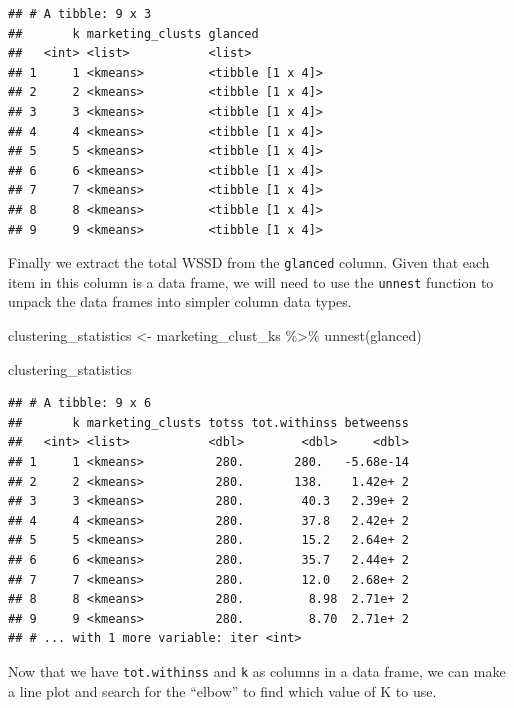 \documentclass[
]{krantz}
\makeatletter
\newenvironment{Shaded}{\begin{snugshade}}{\end{snugshade}}
\newcommand{\FunctionTok}[1]{\textcolor[rgb]{0,0,0}{#1}}
\newcommand{\NormalTok}[1]{#1}
\newcommand{\OtherTok}[1]{\textcolor[rgb]{0.37,0.37,0.37}{#1}}
\newcommand{\SpecialCharTok}[1]{\textcolor[rgb]{0,0,0}{#1}}
\newenvironment{kframe}{%
\medskip{}
\setlength{\fboxsep}{.8em}
 \def\at@end@of@kframe{}%
 \ifinner\ifhmode%
  \def\at@end@of@kframe{\end{minipage}}%
  \begin{minipage}{\columnwidth}%
 \fi\fi%
 \def\FrameCommand##1{\hskip\@totalleftmargin \hskip-\fboxsep
 \colorbox{shadecolor}{##1}\hskip-\fboxsep
     \hskip-\linewidth \hskip-\@totalleftmargin \hskip\columnwidth}%
 \MakeFramed {\advance\hsize-\width
   \@totalleftmargin\z@ \linewidth\hsize
   \@setminipage}}%
 {\par\unskip\endMakeFramed%
 \at@end@of@kframe}
\renewenvironment{Shaded}{\begin{kframe}}{\end{kframe}}
\makeatother
\begin{document}
\begin{verbatim}
## # A tibble: 9 x 3
##       k marketing_clusts glanced         
##   <int> <list>           <list>          
## 1     1 <kmeans>         <tibble [1 x 4]>
## 2     2 <kmeans>         <tibble [1 x 4]>
## 3     3 <kmeans>         <tibble [1 x 4]>
## 4     4 <kmeans>         <tibble [1 x 4]>
## 5     5 <kmeans>         <tibble [1 x 4]>
## 6     6 <kmeans>         <tibble [1 x 4]>
## 7     7 <kmeans>         <tibble [1 x 4]>
## 8     8 <kmeans>         <tibble [1 x 4]>
## 9     9 <kmeans>         <tibble [1 x 4]>
\end{verbatim}

Finally we extract the total WSSD from the \texttt{glanced} column. Given that each
item in this column is a data frame, we will need to use the \texttt{unnest} function
to unpack the data frames into simpler column data types.

\begin{Shaded}
\begin{Highlighting}[]
\NormalTok{clustering\_statistics }\OtherTok{\textless{}{-}}\NormalTok{ marketing\_clust\_ks }\SpecialCharTok{\%\textgreater{}\%}
  \FunctionTok{unnest}\NormalTok{(glanced)}

\NormalTok{clustering\_statistics}
\end{Highlighting}
\end{Shaded}

\begin{verbatim}
## # A tibble: 9 x 6
##       k marketing_clusts totss tot.withinss betweenss
##   <int> <list>           <dbl>        <dbl>     <dbl>
## 1     1 <kmeans>          280.       280.   -5.68e-14
## 2     2 <kmeans>          280.       138.    1.42e+ 2
## 3     3 <kmeans>          280.        40.3   2.39e+ 2
## 4     4 <kmeans>          280.        37.8   2.42e+ 2
## 5     5 <kmeans>          280.        15.2   2.64e+ 2
## 6     6 <kmeans>          280.        35.7   2.44e+ 2
## 7     7 <kmeans>          280.        12.0   2.68e+ 2
## 8     8 <kmeans>          280.         8.98  2.71e+ 2
## 9     9 <kmeans>          280.         8.70  2.71e+ 2
## # ... with 1 more variable: iter <int>
\end{verbatim}

Now that we have \texttt{tot.withinss} and \texttt{k} as columns in a data frame, we can make a line plot
and search for the ``elbow'' to find which value of K to use.
\end{document}
